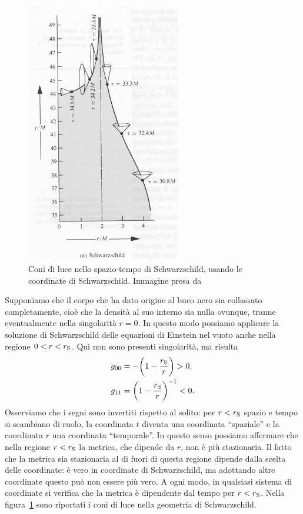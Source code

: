 \begin{figure}[tb]
  \centering
  \includegraphics[width=0.6\textwidth]{figure/Schwarzschilddiagram.jpg}
  \caption[Coni di luce nello spazio-tempo di Schwarzschild, usando le
  coordinate di Schwarzschild]{Coni di luce nello spazio-tempo di Schwarzschild,
    usando le coordinate di Schwarzschild.  Immagine presa
    da~\textcite{misner:gravitation}}
  \label{fig:coni-schwarzschild}
\end{figure}
Supponiamo che il corpo che ha dato origine al buco nero sia collassato
completamente, cioè che la densità al suo interno sia nulla ovunque, tranne
eventualmente nella singolarità \(r = 0\).  In questo modo possiamo applicare la
soluzione di Schwarzschild delle equazioni di Einstein nel vuoto anche nella
regione \(0 < r < r_{\textup{S}}\).  Qui non sono presenti singolarità, ma
risulta
\begin{subequations}
  \begin{align}
    g_{00} &= -\biggl(1 - \frac{r_{\textup{S}}}{r}\biggr) > 0, \\
    g_{11} &= \biggl(1 - \frac{r_{\textup{S}}}{r}\biggr)^{-1} < 0.
  \end{align}
\end{subequations}
Osserviamo che i segni sono invertiti rispetto al solito: per \(r <
r_{\textup{S}}\) spazio e tempo si scambiano di ruolo, la coordinata \(t\)
diventa una coordinata ``spaziale'' e la coordinata \(r\) una coordinata
``temporale''.  In questo senso possiamo affermare che nella regione \(r <
r_{\textup{S}}\) la metrica, che dipende da \(r\), non è più stazionaria.  Il
fatto che la metrica sia stazionaria al di fuori di questa regione dipende dalla
scelta delle coordinate: è vero in coordinate di Schwarzschild, ma adottando
altre coordinate questo può non essere più vero.  A ogni modo, in qualsiasi
sistema di coordinate si verifica che la metrica è dipendente dal tempo per \(r
< r_{\textup{S}}\).  Nella figura~\ref{fig:coni-schwarzschild} sono riportati i
coni di luce nella geometria di Schwarzschild.

